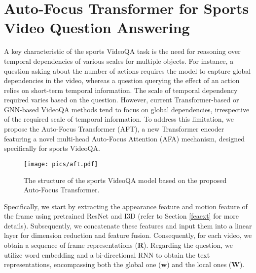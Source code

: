 {\section{Auto-Focus Transformer for Sports Video Question Answering}

A key characteristic of the sports VideoQA task is the need for reasoning over temporal dependencies of various scales for multiple objects. For instance, a question asking about the number of actions requires the model to capture global dependencies in the video, whereas a question querying the effect of an action relies on short-term temporal information. The scale of temporal dependency required varies based on the question. However, current Transformer-based or GNN-based VideoQA methods tend to focus on global dependencies, irrespective of the required scale of temporal information. To address this limitation, we propose the Auto-Focus Transformer (AFT), a new Transformer encoder featuring a novel multi-head Auto-Focus Attention (AFA) mechanism, designed specifically for sports VideoQA.


\begin{figure}[tbp]
\centering
\texttt{[image: pics/aft.pdf]}
\caption{The structure of the sports  VideoQA model based on the proposed Auto-Focus Transformer.}
\label{aft}
\end{figure}

Specifically, we start by extracting the appearance feature and motion feature of the frame using pretrained ResNet \citep{he2016deep} and I3D \citep{carreira2017quo} (refer to Section \ref{feaext} for more details). Subsequently, we concatenate these features and input them into a linear layer for dimension reduction and feature fusion. Consequently, for each video, we obtain a sequence of frame representations ($\bm{R}$). Regarding the question, we utilize word embedding and a bi-directional RNN to obtain the text representations, encompassing both the global one ($\bm{w}$) and the local ones ($\bm{W}$).

}
